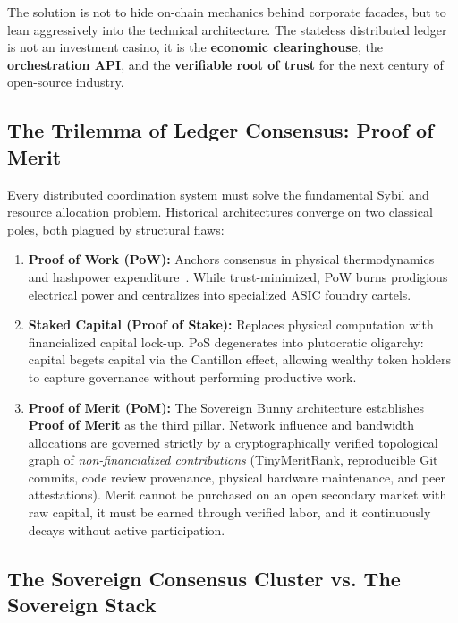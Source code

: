 \documentclass[a4paper,11pt,twoside,parskip=half-,headings=small]{scrartcl}
\begin{document}
The solution is not to hide on-chain mechanics behind corporate facades, but to
lean aggressively into the technical architecture. The stateless distributed ledger
is not an investment casino, it is the \textbf{economic clearinghouse}, the
\textbf{orchestration API}, and the \textbf{verifiable root of trust} for the
next century of open-source industry.

\subsection{The Trilemma of Ledger Consensus: Proof of Merit}

Every distributed coordination system must solve the fundamental Sybil and resource
allocation problem. Historical architectures converge on two classical poles, both
plagued by structural flaws:
\begin{enumerate}
  \item \textbf{Proof of Work (PoW):} Anchors consensus in physical thermodynamics and
hashpower expenditure~\cite{nakamoto2008bitcoin}. While trust-minimized, PoW burns
prodigious electrical power and centralizes into specialized ASIC foundry cartels.
  \item \textbf{Staked Capital (Proof of Stake):} Replaces physical computation with
financialized capital lock-up. PoS degenerates into plutocratic oligarchy: capital
begets capital via the Cantillon effect, allowing wealthy token holders to capture
governance without performing productive work.
  \item \textbf{Proof of Merit (PoM):} The Sovereign Bunny architecture establishes
\textbf{Proof of Merit} as the third pillar. Network influence and bandwidth allocations
are governed strictly by a cryptographically verified topological graph of
\emph{non-financialized contributions} (TinyMeritRank, reproducible Git commits,
code review provenance, physical hardware maintenance, and peer attestations).
Merit cannot be purchased on an open secondary market with raw capital, it must be
earned through verified labor, and it continuously decays without active participation.
\end{enumerate}

\subsection{The Sovereign Consensus Cluster vs. The Sovereign Stack}
\end{document}
